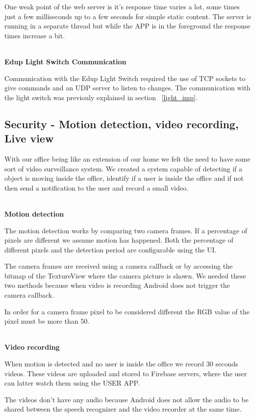 One weak point of the web server is it's response time varies a lot, some times just a few milliseconds up to a few seconds for simple static content. The server is running in a separate thread but while the APP is in the foreground the response times increase a bit.



\mbox{}\\
\textbf{Edup Light Switch Communication}

Communication with the Edup Light Switch required the use of TCP sockets to give commands and an UDP server to listen to changes. The communication with the light switch was previouly explained in section ~\ref{light_imp}.



\subsection{Security - Motion detection, video recording, Live view}

With our office being like an extension of our home we felt the need to have some sort of video surveillance system. We created a system capable of detecting if a object is moving inside the office, identify if a user is inside the office and if not then send a notification to the user and record a small video.


\mbox{}\\
\textbf{Motion detection}

The motion detection works by comparing two camera frames. If a percentage of pixels are different we assume motion has happened. Both the percentage of different pixels and the detection period are configurable using the \ac{UI}.

The camera frames are received using a camera callback or by accessing the bitmap of the TextureView where the camera picture is shown. We needed these two methods because when video is recording Android does not trigger the camera callback.

In order for a camera frame pixel to be considered different the RGB value of the pixel must be more than 50.


\mbox{}\\
\textbf{Video recording}

When motion is detected and no user is inside the office we record 30 seconds videos. These videos are uploaded and stored to Firebase servers, where the user can latter watch them using the USER APP.

The videos don't have any audio because Android does not allow the audio to be shared between the speech recognizer and the video recorder at the same time.


